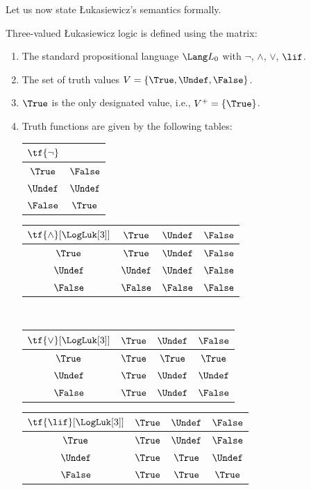 \documentclass[../../../include/open-logic-section]{subfiles}
\begin{document}
Let us now state \L ukasiewicz's semantics formally.

\begin{defn}
Three-valued \L ukasiewicz logic is defined using the matrix:
\begin{enumerate}
  \item The standard propositional language $\Lang L_0$ with
  $\lnot$, $\land$, $\lor$, $\lif$.
  \item The set of truth values $V = \{\True, \Undef, \False\}$.
  \item $\True$ is the only designated value, i.e., $V^+ = \{\True\}$.
  \item Truth functions are given by the following tables:
  \begin{center}
    \begin{tabular}{c|c} 
      $\tf{\lnot}$ & \\ 
      \hline  
      $\True$ & $\False$ \\ 
      $\Undef$ & $\Undef$ \\
      $\False$ & $\True$ 
    \end{tabular}
    \quad
    \begin{tabular}{c|ccc} 
      $\tf{\land}[\LogLuk[3]]$ & $\True$ & $\Undef$ & $\False$ \\ 
      \hline 
      $\True$ & $\True$ & $\Undef$ & $\False$ \\ 
      $\Undef$ & $\Undef$ & $\Undef$ & $\False$\\ 
      $\False$ & $\False$ & $\False$ & $\False$ 
    \end{tabular}
    \\[2ex]
    \begin{tabular}{c|ccc} 
      $\tf{\lor}[\LogLuk[3]]$ & $\True$ & $\Undef$ & $\False$ \\ 
      \hline 
      $\True$ & $\True$ & $\True$ & $\True$ \\ 
      $\Undef$ & $\True$ & $\Undef$ & $\Undef$ \\
      $\False$ & $\True$ & $\Undef$ & $\False$ 
    \end{tabular}
    \quad
    \begin{tabular}{c|ccc} 
      $\tf{\lif}[\LogLuk[3]]$ & $\True$ & $\Undef$ & $\False$ \\ 
      \hline 
      $\True$ & $\True$ & $\Undef$ & $\False$ \\ 
      $\Undef$ & $\True$ & $\True$ & $\Undef$  \\ 
      $\False$ & $\True$ & $\True$ & $\True$ 
    \end{tabular}
  \end{center} 
\end{enumerate}
\end{defn}
\end{document}
